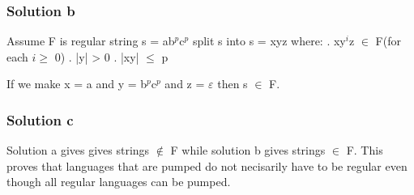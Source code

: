 \documentclass{article}
\begin{document}
\begin{empfile}
\subsubsection*{Solution b}
Assume F is regular \newline
string s = ab$^p$c$^p$ \newline
split s into s = xyz where: . xy$^i$z $\in$ F(for each $i \ge$ 0) . |y| > 0 . |xy| $\le$ p \newline

If we make x = a and y = b$^p$c$^p$ and z = $\varepsilon$ then s $\in$ F. 

\subsubsection*{Solution c}

Solution a gives gives strings $\notin$ F while solution b gives strings $\in$ F.
This proves that languages that are pumped do not necisarily have to 
be regular even though all regular languages can be pumped.


\end{empfile}
\immediate{}
\end{document}
